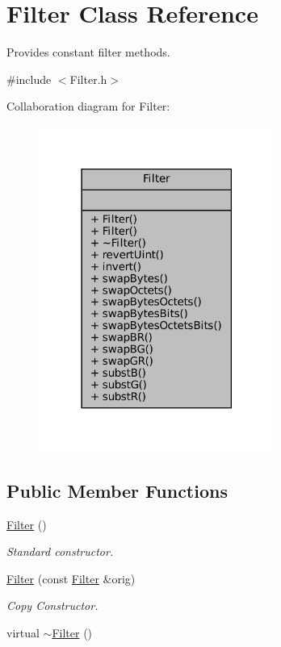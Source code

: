 \hypertarget{classFilter}{}\section{Filter Class Reference}
\label{classFilter}


Provides constant filter methods.  




{\ttfamily \#include $<$Filter.\+h$>$}



Collaboration diagram for Filter\+:\nopagebreak
\begin{figure}[H]
\begin{center}
\leavevmode
\includegraphics[width=219pt]{classFilter__coll__graph}
\end{center}
\end{figure}
\subsection*{Public Member Functions}
\begin{DoxyCompactItemize}
\item 
\mbox{\hyperlink{classFilter_ad15994c30d497afd567a6445446a249e}{Filter}} ()
\begin{DoxyCompactList}\small\item\em Standard constructor. \end{DoxyCompactList}\item 
\mbox{\hyperlink{classFilter_a6ed476659596aa4bc61e69514960d95b}{Filter}} (const \mbox{\hyperlink{classFilter}{Filter}} \&orig)
\begin{DoxyCompactList}\small\item\em Copy Constructor. \end{DoxyCompactList}\item 
virtual \mbox{\hyperlink{classFilter_a502ee334d42eac3edbaf32b599f9c35e}{$\sim$\+Filter}} ()
\end{DoxyCompactItemize}
